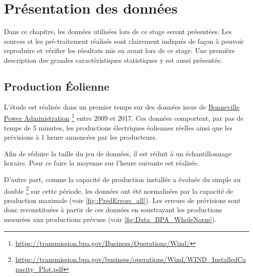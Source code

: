 \documentclass[12pt]{report}
\begin{document}
\chapter{Présentation des données}
Dans ce chapitre, les données utilisées lors de ce stage seront présentées. Les sources et les pré-traitement réalisés sont clairement indiqués de façon à pouvoir reproduire et vérifier les résultats mis en avant lors de ce stage. Une première description des grandes caractéristiques statistiques y est aussi présentée. 

\section{Production Éolienne}
L'étude est réalisée dans un premier temps sur des données issue de \href{https://transmission.bpa.gov/Business/Operations/Wind/}{Bonneville Power Administration}  \footnote{\url{https://transmission.bpa.gov/Business/Operations/Wind/}} entre 2009 et 2017. Ces données comportent, par pas de temps de 5 minutes, les productions électriques éoliennes réelles ainsi que les prévisions à 1 heure annoncées par les producteurs.

Afin de réduire la taille du jeu de données, il est réduit à un échantillonnage horaire. Pour ce faire la moyenne sur l'heure suivante est réalisée.

D'autre part, comme la capacité de production installée a évoluée du simple au double  \footnote{\url{https://transmission.bpa.gov/business/operations/Wind/WIND_InstalledCapacity_Plot.pdf}} sur cette période, les données ont été normalisées par la capacité de production maximale (voir \ref{fig::PredErrors_all}). Les erreurs de prévisions sont donc reconstituées à partir de ces données en soustrayant les productions mesurées aux productions prévues (voir \ref{fig:Data_BPA_WholeNorm}).
\end{document}
